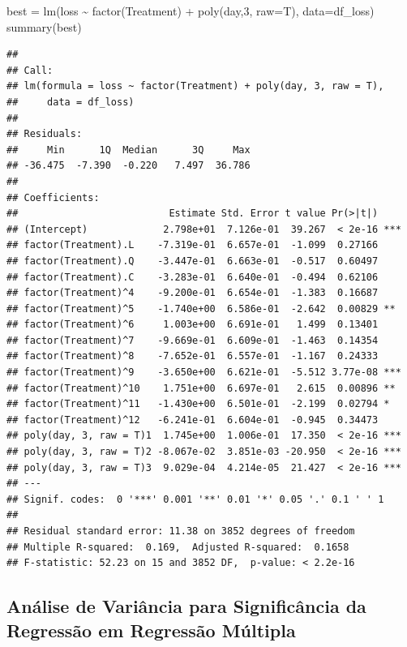 \documentclass[
  brazilian,
  12pt,
  a4paper,
]{article}
\newenvironment{Shaded}{\begin{snugshade}}{\end{snugshade}}
\newcommand{\AttributeTok}[1]{\textcolor[rgb]{0.40,0.45,0.13}{#1}}
\newcommand{\DecValTok}[1]{\textcolor[rgb]{0.68,0.00,0.00}{#1}}
\newcommand{\FunctionTok}[1]{\textcolor[rgb]{0.28,0.35,0.67}{#1}}
\newcommand{\NormalTok}[1]{\textcolor[rgb]{0.00,0.46,0.62}{#1}}
\newcommand{\OtherTok}[1]{\textcolor[rgb]{0.00,0.46,0.62}{#1}}
\newcommand{\SpecialCharTok}[1]{\textcolor[rgb]{0.37,0.37,0.37}{#1}}
\begin{document}
\begin{Shaded}
\begin{Highlighting}[]
\NormalTok{best }\OtherTok{=} \FunctionTok{lm}\NormalTok{(loss }\SpecialCharTok{\textasciitilde{}} \FunctionTok{factor}\NormalTok{(Treatment) }\SpecialCharTok{+} \FunctionTok{poly}\NormalTok{(day,}\DecValTok{3}\NormalTok{, }\AttributeTok{raw=}\NormalTok{T), }\AttributeTok{data=}\NormalTok{df\_loss)}
\FunctionTok{summary}\NormalTok{(best)}
\end{Highlighting}
\end{Shaded}

\begin{verbatim}
## 
## Call:
## lm(formula = loss ~ factor(Treatment) + poly(day, 3, raw = T), 
##     data = df_loss)
## 
## Residuals:
##     Min      1Q  Median      3Q     Max 
## -36.475  -7.390  -0.220   7.497  36.786 
## 
## Coefficients:
##                          Estimate Std. Error t value Pr(>|t|)    
## (Intercept)             2.798e+01  7.126e-01  39.267  < 2e-16 ***
## factor(Treatment).L    -7.319e-01  6.657e-01  -1.099  0.27166    
## factor(Treatment).Q    -3.447e-01  6.663e-01  -0.517  0.60497    
## factor(Treatment).C    -3.283e-01  6.640e-01  -0.494  0.62106    
## factor(Treatment)^4    -9.200e-01  6.654e-01  -1.383  0.16687    
## factor(Treatment)^5    -1.740e+00  6.586e-01  -2.642  0.00829 ** 
## factor(Treatment)^6     1.003e+00  6.691e-01   1.499  0.13401    
## factor(Treatment)^7    -9.669e-01  6.609e-01  -1.463  0.14354    
## factor(Treatment)^8    -7.652e-01  6.557e-01  -1.167  0.24333    
## factor(Treatment)^9    -3.650e+00  6.621e-01  -5.512 3.77e-08 ***
## factor(Treatment)^10    1.751e+00  6.697e-01   2.615  0.00896 ** 
## factor(Treatment)^11   -1.430e+00  6.501e-01  -2.199  0.02794 *  
## factor(Treatment)^12   -6.241e-01  6.604e-01  -0.945  0.34473    
## poly(day, 3, raw = T)1  1.745e+00  1.006e-01  17.350  < 2e-16 ***
## poly(day, 3, raw = T)2 -8.067e-02  3.851e-03 -20.950  < 2e-16 ***
## poly(day, 3, raw = T)3  9.029e-04  4.214e-05  21.427  < 2e-16 ***
## ---
## Signif. codes:  0 '***' 0.001 '**' 0.01 '*' 0.05 '.' 0.1 ' ' 1
## 
## Residual standard error: 11.38 on 3852 degrees of freedom
## Multiple R-squared:  0.169,  Adjusted R-squared:  0.1658 
## F-statistic: 52.23 on 15 and 3852 DF,  p-value: < 2.2e-16
\end{verbatim}

\subsection{Análise de Variância para Significância da Regressão em
Regressão
Múltipla}\label{anuxe1lise-de-variuxe2ncia-para-significuxe2ncia-da-regressuxe3o-em-regressuxe3o-muxfaltipla}
\end{document}
